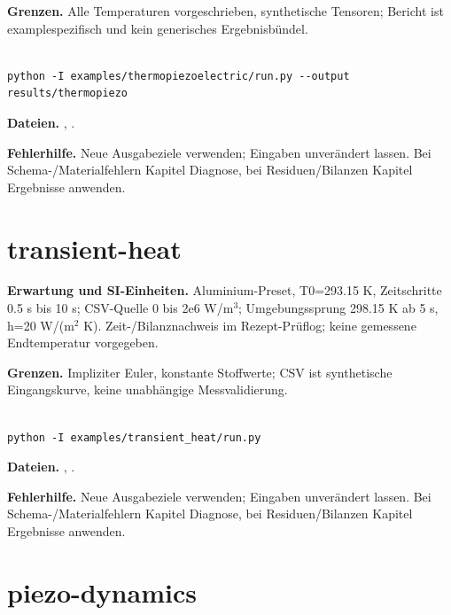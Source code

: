 \textbf{Grenzen.} Alle Temperaturen vorgeschrieben, synthetische Tensoren; Bericht ist examplespezifisch und kein generisches Ergebnisbündel.

\begin{lstlisting}

python -I examples/thermopiezoelectric/run.py --output results/thermopiezo

\end{lstlisting}

\textbf{Dateien.} , .

\textbf{Fehlerhilfe.} Neue Ausgabeziele verwenden; Eingaben unverändert lassen. Bei Schema-/Materialfehlern Kapitel Diagnose, bei Residuen/Bilanzen Kapitel Ergebnisse anwenden.



\section{transient-heat}\label{recipe:transient-heat}

\textbf{Erwartung und SI-Einheiten.} Aluminium-Preset, T0=293.15 K, Zeitschritte 0.5 s bis 10 s; CSV-Quelle 0 bis 2e6 W/m$^3$; Umgebungssprung 298.15 K ab 5 s, h=20 W/(m$^2$ K). Zeit-/Bilanznachweis im Rezept-Prüflog; keine gemessene Endtemperatur vorgegeben.

\textbf{Grenzen.} Impliziter Euler, konstante Stoffwerte; CSV ist synthetische Eingangskurve, keine unabhängige Messvalidierung.

\begin{lstlisting}

python -I examples/transient_heat/run.py

\end{lstlisting}

\textbf{Dateien.} , .

\textbf{Fehlerhilfe.} Neue Ausgabeziele verwenden; Eingaben unverändert lassen. Bei Schema-/Materialfehlern Kapitel Diagnose, bei Residuen/Bilanzen Kapitel Ergebnisse anwenden.



\section{piezo-dynamics}\label{recipe:piezo-dynamics}

